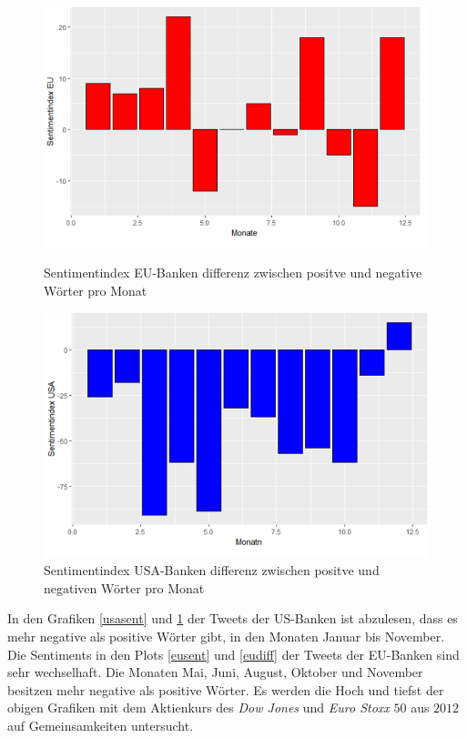 \begin{figure}[H]
	\begin{minipage}[b]{.4\linewidth} %
	\includegraphics[width=1\textwidth]{Pictures/Monateu.png}
	\caption{Sentimentindex EU-Banken differenz  zwischen positve und negative Wörter pro Monat}\label{eudiff}
\end{minipage}
	\hspace{.2\linewidth}
\begin{minipage}[b]{.4\linewidth} %
	\includegraphics[width=1\textwidth]{Pictures/Monatusa.png}
	\caption{Sentimentindex USA-Banken differenz  zwischen positve und negativen Wörter pro Monat}\label{usadiff}
\end{minipage}
\end{figure}
In den Grafiken \ref{usasent} und \ref{usadiff} der Tweets der US-Banken  ist abzulesen, dass es mehr negative als positive Wörter gibt, in den Monaten Januar bis November. Die Sentiments in den Plots \ref{eusent} und \ref{eudiff} der Tweets der EU-Banken sind sehr wechselhaft. Die Monaten Mai, Juni, August, Oktober und November besitzen mehr negative als positive Wörter. Es werden die Hoch und tiefst der obigen Grafiken mit dem Aktienkurs des \textit{Dow Jones} und \textit{Euro Stoxx} $50$ aus $2012$ auf Gemeinsamkeiten untersucht. 
